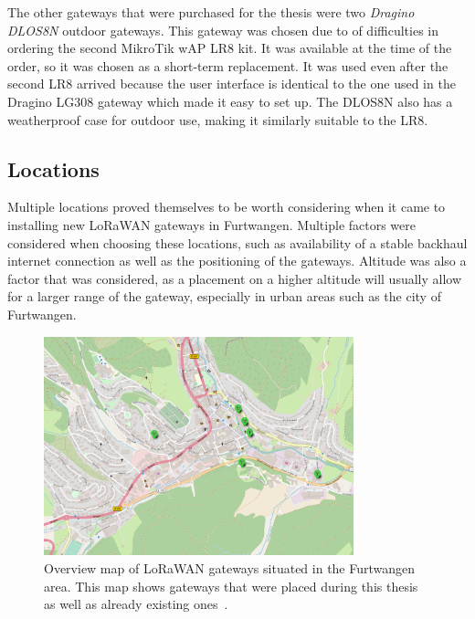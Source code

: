 The other gateways that were purchased for the thesis were two \emph{Dragino DLOS8N} outdoor gateways.
This gateway was chosen due to of difficulties in ordering the second MikroTik wAP LR8 kit.
It was available at the time of the order, so it was chosen as a short-term replacement.
It was used even after the second LR8 arrived because the user interface is identical to the one used in the Dragino LG308 gateway which made it easy to set up.
The DLOS8N also has a weatherproof case for outdoor use, making it similarly suitable to the LR8.

\subsection{Locations}\label{sec:gateway-locations}

Multiple locations proved themselves to be worth considering when it came to installing new \ac{LoRaWAN} gateways in Furtwangen.
Multiple factors were considered when choosing these locations, such as availability of a stable backhaul internet connection as well as the positioning of the gateways.
Altitude was also a factor that was considered, as a placement on a higher altitude will usually allow for a larger range of the gateway, especially in urban areas such as the city of Furtwangen.

\begin{figure}[htbp]
    \centering
    \includegraphics[width=0.8\textwidth]{pictures/hardware/gateway-deployment/gateway_deployment_map.png}
    \caption{
        Overview map of \ac{LoRaWAN} gateways situated in the Furtwangen area.
        This map shows gateways that were placed during this thesis as well as already existing ones~\cite{ttn_mapper_ttn_2023}.
    }\label{pic:gateways-placement-map}
\end{figure}

